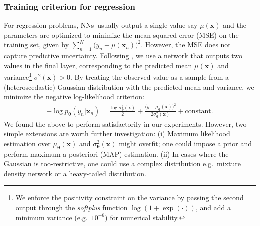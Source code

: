 \documentclass{article}
\newcommand{\bx}{\mathbf{x}}
\newcommand{\btheta}{\mathbf{\theta}}
\newcommand{\nn}{NNs}
\begin{document}
\subsubsection{Training criterion for  regression }\label{sec:regression} %
For regression problems, \nn~usually output a single value say $\mu(\bx)$ and the parameters are optimized to minimize the mean squared error (MSE) on the training set, given by $\sum_{n=1}^N \bigl(y_n-\mu(\bx_n)\bigr)^2$. However, the MSE does not capture predictive uncertainty. %
  Following \citep{nix1994estimating}, we use a network that outputs two values in the final layer, corresponding to the predicted mean $\mu(\bx)$ and variance\footnote{We enforce the positivity constraint on the variance by passing the second output through the \emph{softplus} function $\log(1+\exp(\cdot))$, and  add a minimum variance (e.g.~$10^{-6}$) for numerical stability.}
 $\sigma^2(\bx)>0$. By treating the observed value as a sample from a (heteroscedastic) Gaussian distribution with the predicted mean and variance, we 
minimize the  negative log-likelihood criterion:
\begin{align}
    -\log p_{\btheta}(y_n|\bx_n)%
   =  \frac{\log \sigma_{\btheta}^2(\bx)}{2}  + \frac{\bigl(y-\mu_{\btheta}(\bx)\bigr)^2}{2\sigma_{\btheta}^2(\bx)}  + \textrm{constant}. 
   \label{eq:regression}
\end{align} 
We found the above to perform satisfactorily in our experiments. However, two simple extensions are worth further investigation: (i) Maximum likelihood estimation over  $\mu_{\btheta}(\bx)$ and $\sigma_{\btheta}^2(\bx)$ might overfit; one could impose a prior and perform maximum-a-posteriori (MAP) estimation. (ii) In cases where the Gaussian is too-restrictive, one could use a complex distribution e.g.~mixture density network \citep{bishop1994mixture} or a heavy-tailed distribution.  
\end{document}
